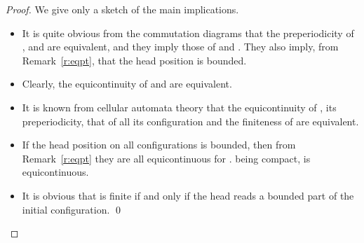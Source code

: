\documentclass{llncs}
\begin{document}
\begin{proof}We give only a sketch of the main implications.
\begin{itemize}
 \item It is quite obvious from the commutation diagrams that the preperiodicity of ,  and  are equivalent, and they imply those of  and .
They also imply, from Remark~\ref{r:eqpt}, that the head position is bounded.
 \item Clearly, the equicontinuity of  and  are equivalent.
 \item It is known from cellular automata theory that the equicontinuity of , its preperiodicity, that of all its configuration and the finiteness of  are equivalent.
 \item If the head position on all configurations is bounded, then from Remark~\ref{r:eqpt} they are all equicontinuous for .  being compact,  is equicontinuous.
 \item It is obvious that  is finite if and only if the head reads a bounded part of the initial configuration.
\qed
\end{itemize}
\end{proof}
\end{document}
